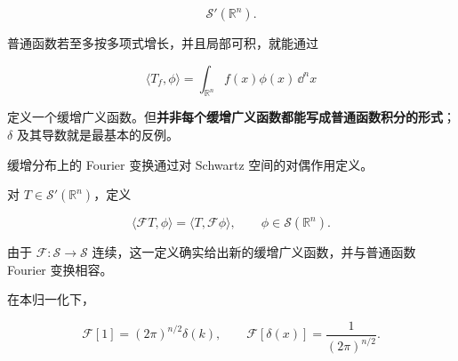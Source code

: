 \[
\mathcal S'(\mathbb R^n).
\]

普通函数若至多按多项式增长，并且局部可积，就能通过

\[
\langle T_f,\phi\rangle
=\int_{\mathbb R^n}f(x)\phi(x)\,\dd^n x
\]

定义一个缓增广义函数。但\textbf{并非每个缓增广义函数都能写成普通函数积分的形式}；$\delta$ 及其导数就是最基本的反例。

缓增分布上的 Fourier 变换通过对 Schwartz 空间的对偶作用定义。

对 $T\in\mathcal S'(\mathbb R^n)$，定义

\[
\boxed{\langle\mathcal F T,\phi\rangle
=\langle T,\mathcal F\phi\rangle},
\qquad \phi\in\mathcal S(\mathbb R^n).
\]

由于 $\mathcal F:\mathcal S\to\mathcal S$ 连续，这一定义确实给出新的缓增广义函数，并与普通函数 Fourier 变换相容。

在本归一化下，

\[
\mathcal F[1]=(2\pi)^{n/2}\delta(k),
\qquad
\mathcal F[\delta(x)]=\frac1{(2\pi)^{n/2}}.
\]

